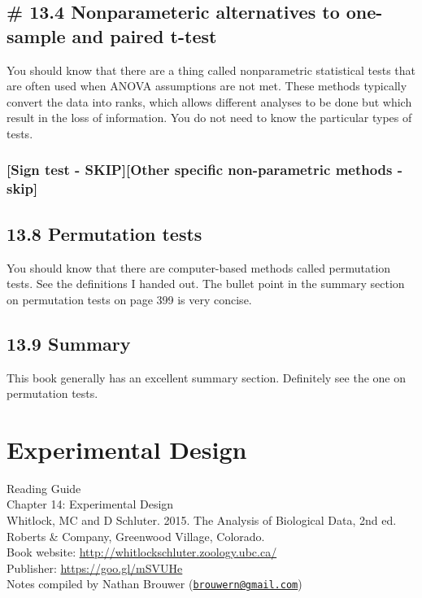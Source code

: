 \documentclass[]{book}
\theoremstyle{definition}
\theoremstyle{definition}
\theoremstyle{definition}
\theoremstyle{remark}
\begin{document}
\section{\# 13.4 Nonparameteric alternatives to one-sample and paired
t-test}\label{nonparameteric-alternatives-to-one-sample-and-paired-t-test}

You should know that there are a thing called nonparametric statistical
tests that are often used when ANOVA assumptions are not met. These
methods typically convert the data into ranks, which allows different
analyses to be done but which result in the loss of information. You do
not need to know the particular types of tests.

\subsection{{[}Sign test - SKIP{]}{[}Other specific non-parametric
methods -
skip{]}}\label{sign-test---skipother-specific-non-parametric-methods---skip}

\section{13.8 Permutation tests}\label{permutation-tests}

You should know that there are computer-based methods called permutation
tests. See the definitions I handed out. The bullet point in the summary
section on permutation tests on page 399 is very concise.

\section{13.9 Summary}\label{summary-4}

This book generally has an excellent summary section. Definitely see the
one on permutation tests.

\chapter{Experimental Design}\label{experimental-design}

Reading Guide\\
Chapter 14: Experimental Design\\
Whitlock, MC and D Schluter. 2015. The Analysis of Biological Data, 2nd
ed. Roberts \& Company, Greenwood Village, Colorado.\\
Book website: \url{http://whitlockschluter.zoology.ubc.ca/}\\
Publisher: \url{https://goo.gl/mSVUHe}\\
Notes compiled by Nathan Brouwer
(\href{mailto:brouwern@gmail.com}{\nolinkurl{brouwern@gmail.com}})
\end{document}

